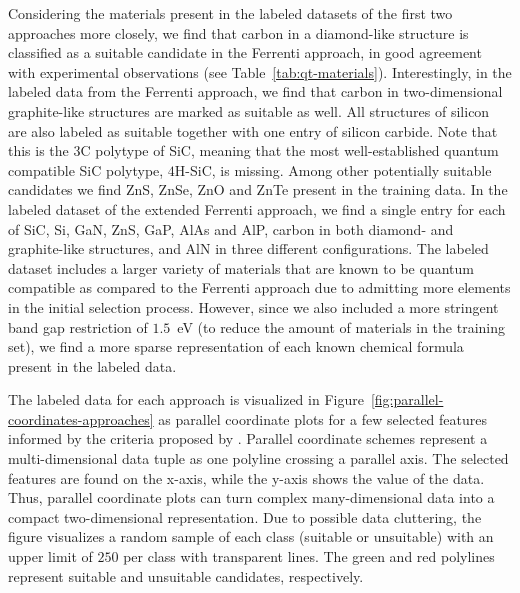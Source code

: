 \documentclass[superscriptaddress,unsortedaddress,
 amsmath,amssymb,
 aps,
]{revtex4-2}
\begin{document}
Considering the materials present in the labeled datasets of the first two approaches more closely, we find that carbon in a diamond-like structure is classified as a suitable candidate in the Ferrenti approach, in good agreement with experimental observations (see Table~\ref{tab:qt-materials}). Interestingly, in the labeled data from the Ferrenti approach, we find that carbon in two-dimensional graphite-like structures are marked as suitable as well. All structures of silicon are also labeled as suitable together with one entry of silicon carbide. Note that this is the $3$C polytype of SiC, meaning that the most well-established quantum compatible SiC polytype, $4$H-SiC, is missing. 
Among other potentially suitable candidates we find ZnS, ZnSe, ZnO and ZnTe present in the training data.  
In the labeled dataset of the extended Ferrenti approach, we find a single entry for each of SiC, Si, GaN, ZnS, GaP, AlAs and AlP, carbon in both diamond- and graphite-like structures, and AlN in three different configurations. The labeled dataset includes a larger variety of materials that are known to be quantum compatible as compared to the Ferrenti approach due to admitting more elements in the initial selection process. However, since we also included a more stringent band gap restriction of $1.5$~eV (to reduce the amount of materials in the training set), we find a more sparse representation of each known chemical formula present in the labeled data. 

The labeled data for each approach is visualized in Figure~\ref{fig:parallel-coordinates-approaches} as parallel coordinate plots for a few selected features informed by the criteria proposed by \citeauthor{Weber2010} \cite{Weber2010}. Parallel coordinate schemes  \cite{Inselberga1990, Inselberg1985} represent a multi-dimensional data tuple as one polyline crossing a parallel axis. The selected features are found on the x-axis, while the y-axis shows the value of the data. Thus, parallel coordinate plots can turn complex many-dimensional data into a compact  two-dimensional representation. Due to possible data cluttering, the figure visualizes a random sample of each class (suitable or unsuitable) with an upper limit of $250$ per class with transparent lines. The green and red polylines represent suitable and unsuitable candidates, respectively. 
\end{document}
